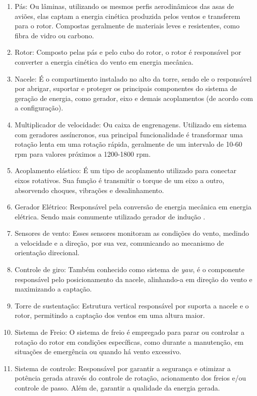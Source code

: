 \begin{enumerate}[label=\Roman*,start=1]
    \item Pás: Ou lâminas, utilizando os mesmos perfis aerodinâmicos das asas de aviões, elas captam a energia cinética produzida pelos ventos e transferem para o rotor. Compostas geralmente de materiais leves e resistentes, como fibra de vidro ou carbono.
    \item Rotor: Composto pelas pás e pelo cubo do rotor, o rotor é responsável por converter a energia cinética do vento em energia mecânica.
    \item Nacele: É o compartimento instalado no alto da torre, sendo ele o responsável por abrigar, suportar e proteger os principais componentes do sistema de geração de energia, como gerador, eixo e demais acoplamentos (de acordo com a configuração).
    \item Multiplicador de velocidade: Ou caixa de engrenagens. Utilizado em sistema com geradores assíncronos, sua principal funcionalidade é transformar uma rotação lenta em uma rotação rápida, geralmente de um intervalo de 10-60 rpm para valores próximos a 1200-1800 rpm.  
    \item Acoplamento elástico: É um tipo de acoplamento utilizado para conectar eixos rotativos. Sua função é transmitir o torque de um eixo a outro, absorvendo choques, vibrações e desalinhamento.
    \item Gerador Elétrico: Responsável pela conversão de energia mecânica em energia elétrica. Sendo mais comumente utilizado gerador de indução \cite{ackermann2005}.
    \item Sensores de vento: Esses sensores monitoram as condições do vento, medindo a velocidade e a direção, por sua vez, comunicando ao mecanismo de orientação direcional.
    \item Controle de giro: Também conhecido como sistema de \textit{yaw}, é o componente responsável pelo posicionamento da nacele, alinhando-a em direção do vento e maximizando a captação.
    \item Torre de sustentação: Estrutura vertical responsável por suporta a nacele e o rotor, permitindo a captação dos ventos em uma altura maior. 
    \item Sistema de Freio: O sistema de freio é empregado para parar ou controlar a rotação do rotor em condições específicas, como durante a manutenção, em situações de emergência ou quando há vento excessivo.
    \item Sistema de controle: Responsável por garantir a segurança e otimizar a potência gerada através do controle de rotação, acionamento dos freios e/ou controle de passo. Além de, garantir a qualidade da energia gerada.
\end{enumerate}
